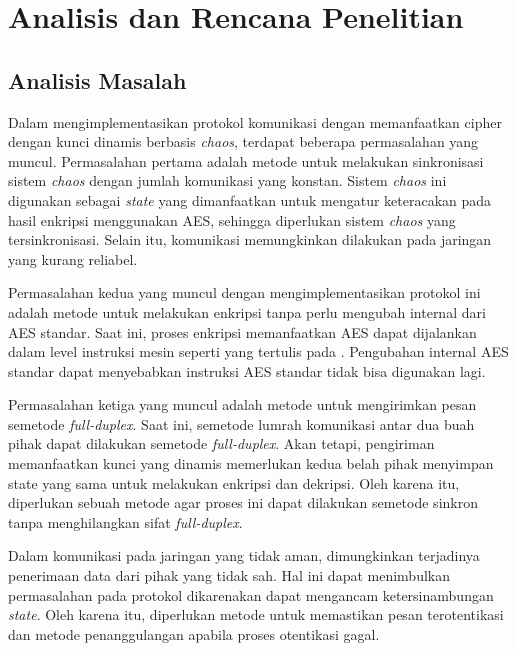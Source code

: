 

\chapter{Analisis dan Rencana Penelitian}

\section{Analisis Masalah}

Dalam mengimplementasikan protokol komunikasi dengan memanfaatkan cipher dengan kunci dinamis berbasis \emph{chaos}, terdapat beberapa permasalahan yang muncul. Permasalahan pertama adalah metode untuk melakukan sinkronisasi sistem \emph{chaos} dengan jumlah komunikasi yang konstan. Sistem \emph{chaos} ini digunakan sebagai \emph{state} yang dimanfaatkan untuk mengatur keteracakan pada hasil enkripsi menggunakan AES, sehingga diperlukan sistem \emph{chaos} yang tersinkronisasi. Selain itu, komunikasi memungkinkan dilakukan pada jaringan yang kurang reliabel.

Permasalahan kedua yang muncul dengan mengimplementasikan protokol ini adalah metode untuk melakukan enkripsi tanpa perlu mengubah internal dari AES standar. Saat ini, proses enkripsi memanfaatkan AES dapat dijalankan dalam level instruksi mesin seperti yang tertulis pada \textcite{gueron2010}. Pengubahan internal AES standar dapat menyebabkan instruksi AES standar tidak bisa digunakan lagi.

Permasalahan ketiga yang muncul adalah metode untuk mengirimkan pesan semetode \emph{full-duplex}. Saat ini, semetode lumrah komunikasi antar dua buah pihak dapat dilakukan semetode \emph{full-duplex}. Akan tetapi, pengiriman memanfaatkan kunci yang dinamis memerlukan kedua belah pihak menyimpan state yang sama untuk melakukan enkripsi dan dekripsi. Oleh karena itu, diperlukan sebuah metode agar proses ini dapat dilakukan semetode sinkron tanpa menghilangkan sifat \emph{full-duplex}.

Dalam komunikasi pada jaringan yang tidak aman, dimungkinkan terjadinya penerimaan data dari pihak yang tidak sah. Hal ini dapat menimbulkan permasalahan pada protokol dikarenakan dapat mengancam ketersinambungan \emph{state}. Oleh karena itu, diperlukan metode untuk memastikan pesan terotentikasi dan metode penanggulangan apabila proses otentikasi gagal.

